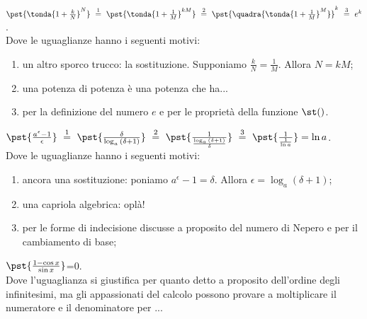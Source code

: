 \begin{esempio}
\(\pst{\tonda{1+\frac{k}{N}}^N}
~ \stackrel{1}{=} ~  
\pst{\tonda{1+\frac{1}{M}}^{kM}}
~ \stackrel{2}{=} ~
\pst{\quadra{\tonda{1+\frac{1}{M}}^M}}^k
~ \stackrel{3}{=} ~ e^k\).\\

Dove le uguaglianze hanno i seguenti motivi:
\begin{enumerate} [nosep]
 \item un altro sporco trucco: la sostituzione. Supponiamo
$\frac{k}{N}=\frac{1}{M}$. Allora $N=kM$;
 \item una potenza di potenza è una potenza che ha...
 \item per la definizione del numero $e$ e per le proprietà della funzione 
$\st()$.
\end{enumerate}
\end{esempio}

\begin{esempio}
\(\pst{\frac{a^\epsilon-1}{\epsilon}}
~ \stackrel{1}{=} ~  
\pst{\frac{\delta}{\log_a{(\delta+1)}}}
~ \stackrel{2}{=} ~
\pst{\frac{1}{\frac{\log_a{(\delta+1)}}{\delta}}}
~ \stackrel{3}{=} ~ 
\pst{\frac{1}{\frac{1}{\ln{a}}}}=\ln{a}\).\\

Dove le uguaglianze hanno i seguenti motivi:
\begin{enumerate} [nosep]
 \item ancora una sostituzione: poniamo
$a^\epsilon-1=\delta$. Allora $\epsilon=\log_a(\delta+1)$;
 \item una capriola algebrica: oplà! 
 \item per le forme di indecisione discusse a proposito del numero di Nepero
e per il cambiamento di base;
\end{enumerate}
\end{esempio}

\begin{esempio}
 \(\pst{\frac{1-\cos x}{\sin x}}\)=0.\\

Dove l'uguaglianza si giustifica per quanto detto a proposito dell'ordine 
degli infinitesimi, ma gli appassionati del calcolo possono provare a 
moltiplicare
il numeratore e il denominatore per ...
\end{esempio}


